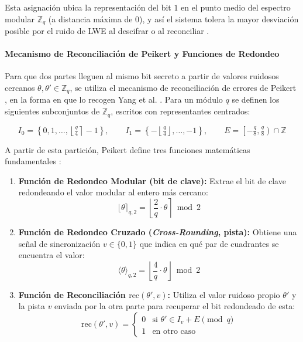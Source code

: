 Esta asignación ubica la representación del bit $1$ en el punto medio del espectro modular $\mathbb{Z}_q$ (a distancia máxima de $0$), y así el sistema tolera la mayor desviación posible por el ruido de LWE al descifrar o al reconciliar \cite{nguyen2019high, rewal2023quantumsafe}.

\paragraph{Mecanismo de Reconciliación de Peikert y Funciones de Redondeo}
\label{sec:peikert}

Para que dos partes lleguen al mismo bit secreto a partir de valores ruidosos cercanos $\theta, \theta' \in \mathbb{Z}_q$, se utiliza el mecanismo de reconciliación de errores de Peikert \cite{peikert2014lattice}, en la forma en que lo recogen Yang et al. \cite{yang2025multiserver}. Para un módulo $q$ se definen los siguientes subconjuntos de $\mathbb{Z}_q$, escritos con representantes centrados:

\begin{equation}
I_0 = \left\{0, 1, \dots, \left\lfloor \tfrac{q}{4} \right\rceil - 1\right\}, \qquad I_1 = \left\{-\left\lfloor \tfrac{q}{4} \right\rfloor, \dots, -1\right\}, \qquad E = \left[-\tfrac{q}{8}, \tfrac{q}{8}\right) \cap \mathbb{Z}
\end{equation}

A partir de esta partición, Peikert define tres funciones matemáticas fundamentales \cite{peikert2014lattice, yang2025multiserver}:

\begin{enumerate}
    \item \textbf{Función de Redondeo Modular (bit de clave):} Extrae el bit de clave redondeando el valor modular al entero más cercano:
    \begin{equation}
    \lfloor \theta \rceil_{q, 2} = \left\lfloor \frac{2}{q} \cdot \theta \right\rceil \bmod 2
    \end{equation}

    \item \textbf{Función de Redondeo Cruzado (\textit{Cross-Rounding}, pista):} Obtiene una señal de sincronización $v \in \{0, 1\}$ que indica en qué par de cuadrantes se encuentra el valor:
    \begin{equation}
    \langle \theta \rangle_{q, 2} = \left\lfloor \frac{4}{q} \cdot \theta \right\rfloor \bmod 2
    \end{equation}

    \item \textbf{Función de Reconciliación $\mathrm{rec}(\theta', v)$:} Utiliza el valor ruidoso propio $\theta'$ y la pista $v$ enviada por la otra parte para recuperar el bit redondeado de esta:
    \begin{equation}
    \mathrm{rec}(\theta', v) = \begin{cases} 0 & \text{si } \theta' \in I_v + E \pmod q \\ 1 & \text{en otro caso} \end{cases}
    \end{equation}
\end{enumerate}


